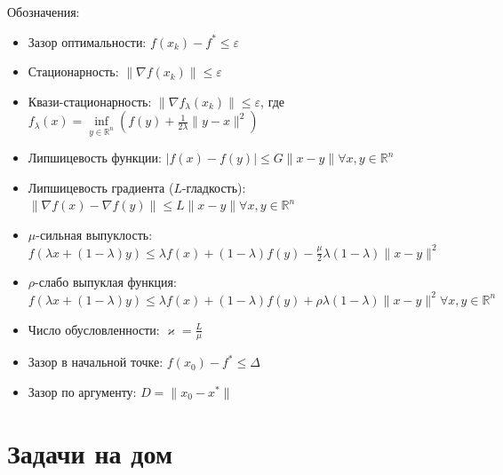 \documentclass[
  russian,
  letterpaper,
  DIV=11,
  numbers=noendperiod]{scrartcl}
\providecommand{\tightlist}{%
  \setlength{\itemsep}{0pt}\setlength{\parskip}{0pt}}
\begin{document}
Обозначения:

\begin{itemize}
\tightlist
\item
  Зазор оптимальности: \(f(x_k) - f^* \leq \varepsilon\)
\item
  Стационарность: \(\|\nabla f(x_k)\| \leq \varepsilon\)
\item
  Квази-стационарность: \(\|\nabla f_\lambda(x_k)\| \leq \varepsilon\),
  где
  \(f_\lambda(x) = \inf\limits_{y \in \mathbb{R}^n} \left(f(y) + \frac{1}{2\lambda}\|y - x\|^2\right)\)
\item
  Липшицевость функции:
  \(|f(x) - f(y)| \leq G \|x - y\| \forall x, y \in \mathbb{R}^n\)
\item
  Липшицевость градиента (\(L\)-гладкость):
  \(\|\nabla f(x) - \nabla f(y)\| \leq L \|x - y\| \forall x, y \in \mathbb{R}^n\)
\item
  \(\mu\)-сильная выпуклость:
  \(f(\lambda x + (1 - \lambda)y) \le \lambda f(x) + (1 - \lambda)f(y) - \frac{\mu}{2} \lambda (1 - \lambda)\|x - y\|^2\)
\item
  \(\rho\)-слабо выпуклая функция:
  \(f(\lambda x + (1 - \lambda)y) \le \lambda f(x) + (1 - \lambda)f(y) + \rho \lambda (1 - \lambda)\|x - y\|^2 \forall x, y \in \mathbb{R}^n\)
\item
  Число обусловленности: \(\varkappa = \frac{L}{\mu}\)
\item
  Зазор в начальной точке: \(f(x_0) - f^* \leq \Delta\)
\item
  Зазор по аргументу: \(D = \|x_0 - x^*\|\)
\end{itemize}

\normalsize

\section{Задачи на
дом}\label{ux437ux430ux434ux430ux447ux438-ux43dux430-ux434ux43eux43c}
\end{document}
